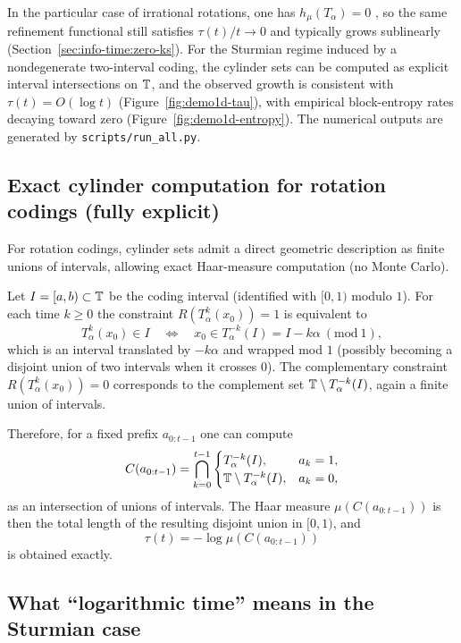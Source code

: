 In the particular case of irrational rotations, one has $h_\mu(T_\alpha)=0$ \cite{Walters1982}, so the same refinement functional still satisfies $\tau(t)/t\to 0$ and typically grows sublinearly (Section~\ref{sec:info-time:zero-ks}). For the Sturmian regime induced by a nondegenerate two-interval coding, the cylinder sets can be computed as explicit interval intersections on $\mathbb{T}$, and the observed growth is consistent with $\tau(t)=O(\log t)$ (Figure~\ref{fig:demo1d-tau}), with empirical block-entropy rates decaying toward zero (Figure~\ref{fig:demo1d-entropy}). The numerical outputs are generated by \texttt{scripts/run\_all.py}.

\subsection{Exact cylinder computation for rotation codings (fully explicit)}\label{sec:appendix:toy:cylinders}

For rotation codings, cylinder sets admit a direct geometric description as finite unions of intervals, allowing exact Haar-measure computation (no Monte Carlo).

Let $I=[a,b)\subset\mathbb{T}$ be the coding interval (identified with $[0,1)$ modulo $1$). For each time $k\ge 0$ the constraint $R(T_\alpha^k(x_0))=1$ is equivalent to
\[
T_\alpha^k(x_0)\in I
\quad\Longleftrightarrow\quad
x_0\in T_\alpha^{-k}(I)=I-k\alpha\ (\mathrm{mod}\ 1),
\]
which is an interval translated by $-k\alpha$ and wrapped mod $1$ (possibly becoming a disjoint union of two intervals when it crosses $0$). The complementary constraint $R(T_\alpha^k(x_0))=0$ corresponds to the complement set $\mathbb{T}\setminus T_\alpha^{-k}(I)$, again a finite union of intervals.

Therefore, for a fixed prefix $a_{0:t-1}$ one can compute
\[
C(a_{0:t-1})
=\bigcap_{k=0}^{t-1}
\begin{cases}
T_\alpha^{-k}(I), & a_k=1,\\
\mathbb{T}\setminus T_\alpha^{-k}(I), & a_k=0,
\end{cases}
\]
as an intersection of unions of intervals. The Haar measure $\mu(C(a_{0:t-1}))$ is then the total length of the resulting disjoint union in $[0,1)$, and
\[
\tau(t)=-\log\mu(C(a_{0:t-1}))
\]
is obtained exactly.

\subsection{What ``logarithmic time'' means in the Sturmian case}\label{sec:appendix:toy:logtime}

